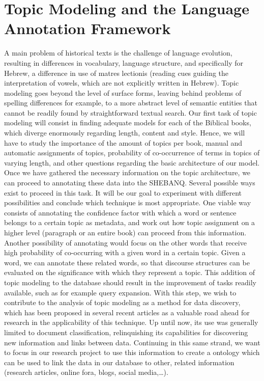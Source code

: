 \documentclass[10pt,a4paper]{article}
\begin{document}
\section{Topic Modeling and the Language Annotation Framework}
A main problem of historical texts is the challenge of language evolution, resulting in differences in vocabulary, language structure, and specifically for Hebrew, a difference in use of matres lectionis (reading cues guiding the interpretation of vowels, which are not explicitly written in Hebrew). Topic modeling goes beyond the level of surface forms, leaving behind problems of spelling differences for example, to a more abstract level of semantic entities that cannot be readily found by straightforward textual search. Our first task of topic modeling will consist in finding adequate models for each of the Biblical books, which diverge enormously regarding length, content and style. Hence, we will have to study the importance of the amount of topics per book, manual and automatic assignments of topics, probability of co-occurrence of terms in topics of varying length, and other questions regarding the basic architecture of our model. 
\\Once we have gathered the necessary information on the topic architecture, we can proceed to annotating these data into the SHEBANQ. Several possible ways exist to proceed in this task. It will be our goal to experiment with different possibilities and conclude which technique is most appropriate. One viable way consists of annotating the confidence factor with which a word or sentence belongs to a certain topic as metadata, and work out how topic assignment on a higher level (paragraph or an entire book) can proceed from this information. Another possibility of annotating would focus on the other words that receive high probability of co-occurring with a given word in a certain topic. Given a word, we can annotate these related words, so that discourse structures can be evaluated on the significance with which they represent a topic. This addition of topic modeling to the database should result in the improvement of tasks readily available, such as for example query expansion. With this step, we wish to contribute to the analysis of topic modeling as a method for data discovery, which has been proposed in several recent articles as a valuable road ahead for research in the applicability of this technique. Up until now, its use was generally limited to document classification, relinquishing its capabilities for discovering new information and links between data.  Continuing in this same strand, we want to focus in our research project to use this information to create a ontology which can be used to link the data in our database to other, related information (research articles, online fora, blogs, social media,…).
\end{document}
